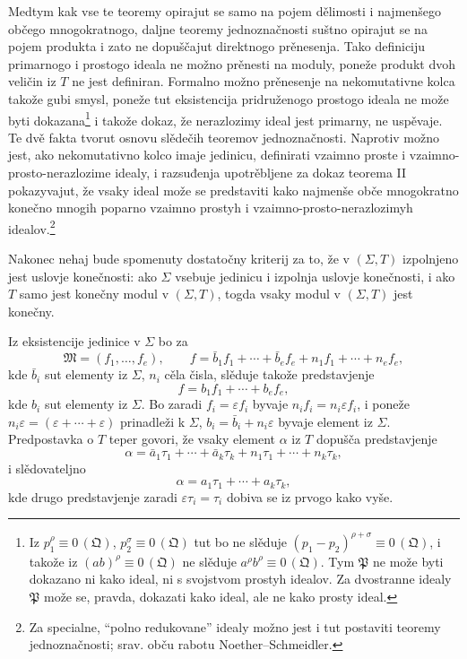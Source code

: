 \documentclass[11pt]{article}
\newcommand{\ideal}[1]{\mathfrak{#1}}
\newcommand{\eqzero}[1]{\equiv 0\,(#1)}
\begin{document}
Medtym kak vse te teoremy opirajut se samo na pojem dělimosti i najmenšego občego mnogokratnogo, daljne teoremy jednoznačnosti suštno opirajut se na pojem produkta i zato ne dopuščajut direktnogo prěnesenja. Tako definiciju primarnogo i prostogo ideala ne možno prěnesti na moduly, poneže produkt dvoh veličin iz \(T\) ne jest definiran. Formalno možno prěnesenje na nekomutativne kolca takože gubi smysl, poneže tut eksistencija pridruženogo prostogo ideala ne može byti dokazana\footnote{Iz \(p_1^\rho\eqzero{\ideal Q}\), \(p_2^\sigma\eqzero{\ideal Q}\) tut bo ne slěduje \((p_1-p_2)^{\rho+\sigma}\eqzero{\ideal Q}\), i takože iz \((ab)^\rho\eqzero{\ideal Q}\) ne slěduje \(a^\rho b^\rho\eqzero{\ideal Q}\). Tym \(\ideal P\) ne može byti dokazano ni kako ideal, ni s svojstvom prostyh idealov. Za dvostranne idealy \(\ideal P\) može se, pravda, dokazati kako ideal, ale ne kako prosty ideal.} i takože dokaz, že nerazlozimy ideal jest primarny, ne uspěvaje. Te dvě fakta tvorut osnovu slědečih teoremov jednoznačnosti. Naprotiv možno jest, ako nekomutativno kolco imaje jedinicu, definirati vzaimno proste i vzaimno-prosto-nerazlozime idealy, i razsuđenja upotrěbljene za dokaz teorema II pokazyvajut, že vsaky ideal može se predstaviti kako najmenše obče mnogokratno konečno mnogih poparno vzaimno prostyh i vzaimno-prosto-nerazlozimyh idealov.\footnote{Za specialne, ``polno redukovane'' idealy možno jest i tut postaviti teoremy jednoznačnosti; srav. obču rabotu Noether--Schmeidler.}

Nakonec nehaj bude spomenuty dostatočny kriterij za to, že v \((\Sigma,T)\) izpolnjeno jest uslovje konečnosti: ako \(\Sigma\) vsebuje jedinicu i izpolnja uslovje konečnosti, i ako \(T\) samo jest konečny modul v \((\Sigma,T)\), togda vsaky modul v \((\Sigma,T)\) jest konečny.

Iz eksistencije jedinice v \(\Sigma\) bo za
\[
 \ideal M=(f_1,\ldots,f_e),\qquad
 f=\bar b_1f_1+\cdots+\bar b_ef_e+n_1f_1+\cdots+n_ef_e,
\]
kde \(\bar b_i\) sut elementy iz \(\Sigma\), \(n_i\) cěla čisla, slěduje takože predstavjenje
\[
 f=b_1f_1+\cdots+b_ef_e,
\]
kde \(b_i\) sut elementy iz \(\Sigma\). Bo zaradi \(f_i=\varepsilon f_i\) byvaje \(n_if_i=n_i\varepsilon f_i\), i poneže \(n_i\varepsilon=(\varepsilon+\cdots+\varepsilon)\) prinadleži k \(\Sigma\), \(b_i=\bar b_i+n_i\varepsilon\) byvaje element iz \(\Sigma\). Predpostavka o \(T\) teper govori, že vsaky element \(\alpha\) iz \(T\) dopušča predstavjenje
\[
 \alpha=\bar a_1\tau_1+\cdots+\bar a_k\tau_k+n_1\tau_1+\cdots+n_k\tau_k,
\]
i slědovateljno
\[
 \alpha=a_1\tau_1+\cdots+a_k\tau_k,
\]
kde drugo predstavjenje zaradi \(\varepsilon\tau_i=\tau_i\) dobiva se iz prvogo kako vyše.
\end{document}
